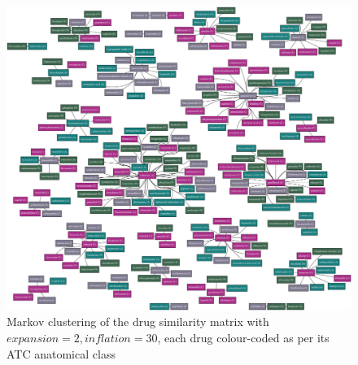 \documentclass[12pt,a4paper,twoside,openright]{report}
\begin{document}
\begin{landscape}
\begin{figure}[!htb]
\includegraphics[height=\textwidth]{drug-cluster-2.eps}
\caption{Markov clustering of the drug similarity matrix with $\mathit{expansion}=2, \mathit{inflation}=30$, each drug colour-coded as per its ATC anatomical class}
\label{fig:drug-cluster}
\end{figure}

\end{landscape}
\end{document}

